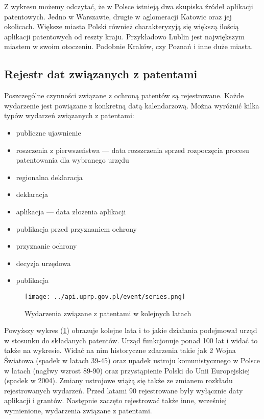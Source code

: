 Z wykresu możemy odczytać, że w Polsce istnieją dwa skupiska źródeł
aplikacji patentowych. Jedno w Warszawie, drugie w aglomeracji Katowic oraz
jej okolicach. Większe miasta Polski również charakteryzyją się większą ilością
aplikacji patentowych od reszty kraju. Przykładowo Lublin jest największym miastem
w swoim otoczeniu. Podobnie Kraków, czy Poznań i inne duże miasta.







\subsection{Rejestr dat związanych z patentami}

Poszczególne czynności związane z ochroną patentów są rejestrowane.
Każde wydarzenie jest powiązane z konkretną datą kalendarzową.
Można wyróżnić kilka typów wydarzeń związanych z patentami:

\begin{itemize}
\item publiczne ujawnienie 
\item roszczenia z pierwszeństwa  --- 
      data rozszczenia sprzed rozpoczęcia procesu patentowania dla wybranego urzędu
\item regionalna deklaracja 
\item deklaracja 
\item aplikacja  --- data złożenia aplikacji
\item publikacja przed przyznaniem ochrony 
\item przyznanie ochrony 
\item decyzja urzędowa
\item publikacja
\end{itemize}

\begin{figure}[H]\centering
\texttt{[image: ../api.uprp.gov.pl/event/series.png]}
\caption{Wydarzenia związane z patentami w kolejnych latach}
\srcuprp
\label{fig:NA-loc-geo.png}
\end{figure}

Powyższy wykres (\ref{fig:NA-loc-geo.png}) obrazuje kolejne lata i to jakie
działania podejmował urząd w stosunku do składanych patentów. Urząd funkcjonuje
ponad 100 lat i widać to także na wykresie.
Widać na nim historyczne zdarzenia takie jak 2 Wojna Światowa (spadek w latach 39-45) 
oraz upadek ustroju komunistycznego w Polsce w latach (nagłwy wzrost 89-90) oraz
przystąpienie Polski do Unii Europejskiej (spadek w 2004).
Zmiany ustrojowe wiążą się także ze zmianem rozkładu rejestrowanych wydarzeń.
Przed latami 90 rejestrowane były wyłącznie daty aplikacji i grantów.
Następnie zaczęto rejestrować także inne, wcześniej wymienione, 
wydarzenia związane z patentami.


